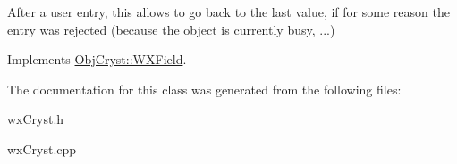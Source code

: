 After a user entry, this allows to go back to the last value, if for some reason the entry was rejected (because the object is currently busy, ...) 

Implements \mbox{\hyperlink{class_obj_cryst_1_1_w_x_field_a178d6d770d1e3adfa02e27da94b2dffa}{Obj\+Cryst\+::\+W\+X\+Field}}.



The documentation for this class was generated from the following files\+:\begin{DoxyCompactItemize}
\item 
wx\+Cryst.\+h\item 
wx\+Cryst.\+cpp\end{DoxyCompactItemize}
